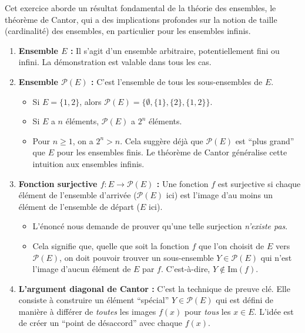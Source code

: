 \documentclass[12pt,a4paper]{report}
\providecommand{\tightlist}{%
  \setlength{\itemsep}{0pt}\setlength{\parskip}{0pt}}
\begin{document}
Cet exercice aborde un résultat fondamental de la théorie des ensembles,
le théorème de Cantor, qui a des implications profondes sur la notion de
taille (cardinalité) des ensembles, en particulier pour les ensembles
infinis.

\begin{enumerate}
\def\labelenumi{\arabic{enumi}.}
\tightlist
\item
  \textbf{Ensemble \(E\) :} Il s'agit d'un ensemble arbitraire,
  potentiellement fini ou infini. La démonstration est valable dans tous
  les cas.
\item
  \textbf{Ensemble \(\mathcal{P}(E)\) :} C'est l'ensemble de tous les
  sous-ensembles de \(E\).

  \begin{itemize}
  \tightlist
  \item
    Si \(E = \{1, 2\}\), alors
    \(\mathcal{P}(E) = \{\emptyset, \{1\}, \{2\}, \{1, 2\}\}\).
  \item
    Si \(E\) a \(n\) éléments, \(\mathcal{P}(E)\) a \(2^n\) éléments.
  \item
    Pour \(n \ge 1\), on a \(2^n > n\). Cela suggère déjà que
    \(\mathcal{P}(E)\) est ``plus grand'' que \(E\) pour les ensembles
    finis. Le théorème de Cantor généralise cette intuition aux
    ensembles infinis.
  \end{itemize}
\item
  \textbf{Fonction surjective \(f: E \to \mathcal{P}(E)\) :} Une
  fonction \(f\) est surjective si chaque élément de l'ensemble
  d'arrivée (\(\mathcal{P}(E)\) ici) est l'image d'au moins un élément
  de l'ensemble de départ (\(E\) ici).

  \begin{itemize}
  \tightlist
  \item
    L'énoncé nous demande de prouver qu'une telle surjection
    \emph{n'existe pas}.
  \item
    Cela signifie que, quelle que soit la fonction \(f\) que l'on
    choisit de \(E\) vers \(\mathcal{P}(E)\), on doit pouvoir trouver un
    sous-ensemble \(Y \in \mathcal{P}(E)\) qui n'est l'image d'aucun
    élément de \(E\) par \(f\). C'est-à-dire, \(Y \notin \text{Im}(f)\).
  \end{itemize}
\item
  \textbf{L'argument diagonal de Cantor :} C'est la technique de preuve
  clé. Elle consiste à construire un élément ``spécial''
  \(Y \in \mathcal{P}(E)\) qui est défini de manière à différer de
  \emph{toutes} les images \(f(x)\) pour \emph{tous} les \(x \in E\).
  L'idée est de créer un ``point de désaccord'' avec chaque \(f(x)\).
\end{enumerate}
\end{document}
